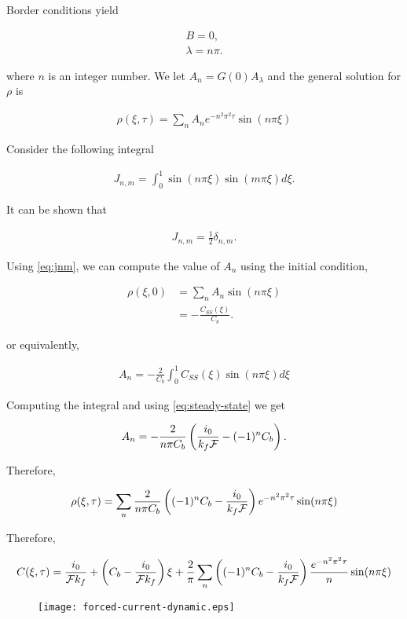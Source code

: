 Border conditions yield 

\begin{align}
	B = 0,\\
	\lambda = n\pi.
\end{align}

where $n$ is an integer number. We let $A_n = G(0) A_\lambda$ and the general solution for $\rho$ is

\begin{align}
	\rho(\xi, \tau) = \sum_n A_n e^{-n^2\pi^2 \tau}\sin(n\pi \xi)
\end{align}


Consider the following integral

\begin{align}
	J_{n,m} = \int_0^1 \sin(n\pi\xi) \sin(m\pi\xi) d\xi.
\end{align}

It can be shown that 

\begin{align}
	J_{n,m} = \frac{1}{2}\delta_{n,m}.
	\label{eq:jnm}
\end{align}

Using \ref{eq:jnm}, we can compute the value of $A_n$ using the initial condition,

\begin{align}
	\rho(\xi, 0) &= \sum_n A_n \sin(n\pi\xi)\\
	 &= -\frac{C_{SS}(\xi)}{C_b}.
\end{align}

or equivalently,

\begin{align}
	A_n = -\frac{2}{C_b} \int_0^1 C_{SS}(\xi)\sin(n\pi\xi) d\xi
\end{align}

Computing the integral and using \ref{eq:steady-state} we get

\begin{align}
	A_n = -\frac{2}{n\pi C_b} \left({\frac{i_0}{k_f\mathcal{F}} - (-1)^n C_b}\right).
\end{align}


Therefore,

\begin{align}
	\rho(\xi, \tau) = \sum_n \frac{2}{n\pi C_b} \left({(-1)^n C_b- \frac{i_0}{k_f\mathcal{F}}}\right) e^{-n^2\pi^2\tau}\sin(n\pi\xi)
\end{align}


Therefore,

\begin{align}
	C(\xi, \tau) = \frac{i_0}{\mathcal{F}k_f} +\left({C_b - \frac{i_0}{\mathcal{F}k_f}}\right)\xi +\frac{2}{\pi}\sum_n \left({(-1)^n C_b- \frac{i_0}{k_f\mathcal{F}}}\right) \frac{e^{-n^2\pi^2\tau}}{n}\sin(n\pi\xi)
\end{align}


\begin{figure}[htbp]
\centering
\texttt{[image: forced-current-dynamic.eps]}
\caption{}
\label{fig:diffusion-reaction-comparison}
\end{figure}

\newpage
